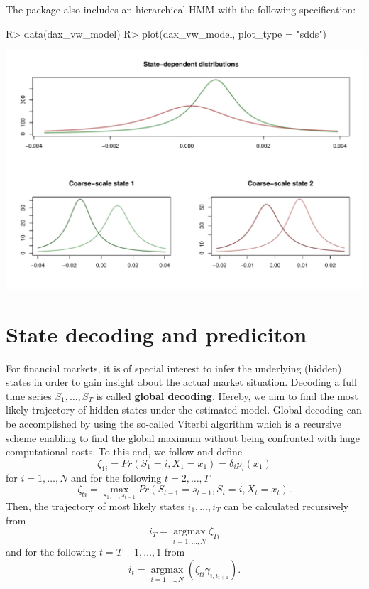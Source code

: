 \documentclass[article]{jss}
\begin{document}
The package also includes an hierarchical HMM with the following specification:

%
\begin{Schunk}
\begin{Sinput}
R> data(dax_vw_model)
R> plot(dax_vw_model, plot_type = "sdds")
\end{Sinput}
\end{Schunk}
\includegraphics{fhmm_oelschlaeger_adam_michels-hhmm_model}
%


\section{State decoding and prediciton} \label{sec:state_decoding_and_prediction} %

For financial markets, it is of special interest to infer the underlying (hidden) states in order to gain insight about the actual market situation. Decoding a full time series $S_1, \ldots, S_T$ is called \textbf{global decoding}. Hereby, we aim to find the most likely trajectory of hidden states under the estimated model. 
Global decoding can be accomplished by using the so-called Viterbi algorithm which is a recursive scheme enabling to find the global maximum without being confronted with huge computational costs. To this end, we follow \cite{zuc16} and define
$$\zeta_{1i} = Pr(S_1 = i, X_1 = x_1) = \delta_i p_i(x_1)$$ 
for $i = 1, \ldots, N$ and for the following $t = 2, \ldots, T$
$$\zeta_{ti} = \operatorname*{max}_{s_1, \ldots, s_{t-1}} Pr(S_{t-1} = s_{t-1}, S_t = i, X_t = x_t).$$ 
Then, the trajectory of most likely states $i_1, \ldots, i_T$ can be calculated recursively from
$$i_T = \operatorname*{argmax}_{i = 1, \ldots, N} \zeta_{Ti}$$ and for the following $t = T-1, \ldots, 1$ from
$$i_t = \operatorname*{argmax}_{i = 1, \ldots, N} (\zeta_{ti} \gamma_{i, i_{t+1}}).$$
\end{document}
